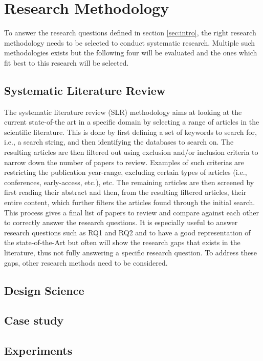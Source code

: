 
\section{Research Methodology}
\label{sec:methodology}

To answer the research questions defined in section \ref{sec:intro},
the right research methodology needs to be selected to conduct 
systematic research.
Multiple such methodologies exists but the following four will be evaluated
and the ones which fit best to this research will be selected.

\subsection{Systematic Literature Review}

The systematic literature review (SLR) methodology aims at
looking at the current state-of-the art in a specific domain by selecting a range 
of articles in the scientific literature\cite{KITCHENHAM2009SLR}.
This is done by first defining a set of keywords to search for, i.e., a search string, 
and then identifying the databases to search on.
The resulting articles are then filtered out using exclusion and/or inclusion criteria
to narrow down the number of papers to review.
Examples of such criterias are restricting the publication year-range,
excluding certain types of articles (i.e., conferences, early-access, etc.), etc.
The remaining articles are then screened by first reading 
their abstract and then, from the resulting filtered articles, their entire content,
which further filters the articles found through the initial search.
This process gives a final list of papers to review and compare against each other 
to correctly answer the research questions. 
It is especially useful to answer research questions such as RQ1 and RQ2
and to have a good representation of the state-of-the-Art
but often will show the research gaps that exists in the literature,
thus not fully answering a specific research question.
To address these gaps, other research methods need to be considered.

\subsection{Design Science}



\subsection{Case study}

\subsection{Experiments}
 
 



